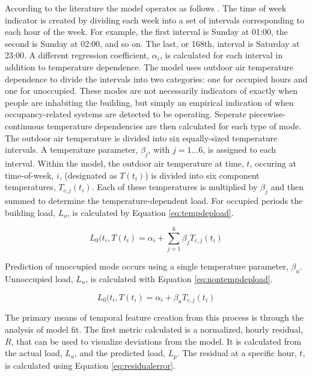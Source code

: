 According to the literature the model operates as follows \cite{price_methods_2010}. The time of week indicator is created by dividing each week into a set of intervals corresponding to each hour of the week. For example, the first interval is Sunday at 01:00, the second is Sunday at 02:00, and so on. The last, or 168th, interval is Saturday at 23:00. A different regression coefficient, $\alpha_i$, is calculated for each interval in addition to temperature dependence. The model uses outdoor air temperature dependence to divide the intervals into two categories: one for occupied hours and one for unoccupied. These modes are not necessarily indicators of exactly when people are inhabiting the building, but simply an empirical indication of when occupancy-related systems are detected to be operating. Seperate piecewise-continuous temperature dependencies are then calculated for each type of mode. The outdoor air temperature is divided into six equally-sized temperature intervals. A temperature parameter, $\beta_j$, with $j = 1...6$, is assigned to each interval. Within the model, the outdoor air temperature at time, $t$, occuring at time-of-week, $i$, (designated as $T(t_i)$) is divided into six component temperatures, $T_{c,j}(t_i)$. Each of these temperatures is multiplied by $\beta_j$ and then summed to determine the temperature-dependent load. For occupied periods the building load, $L_o$, is calculated by Equation \ref{eq:tempdepload}.

\begin{equation}
\label{eq:tempdepload}
L_0(t_i,T(t_i) = \alpha_i + \sum_{j=1}^{6}\beta_j T_{c,j}(t_i)
\end{equation}

Prediction of unoccupied mode occurs using a single temperature parameter, $\beta_u$. Unnoccupied load, $L_u$, is calculated with Equation \ref{eq:nontempdepload}.

\begin{equation}
\label{eq:nontempdepload}
L_0(t_i,T(t_i) = \alpha_i + \beta_u T_{c,j}(t_i)
\end{equation}

The primary means of temporal feature creation from this process is through the analysis of model fit. The first metric calculated is a normalized, hourly residual, $R$, that can be used to visualize deviations from the model. It is calculated from the actual load, $L_a$, and the predicted load, $L_p$. The residual at a specific hour, $t$, is calculated using Equation \ref{eq:residualerror}.

